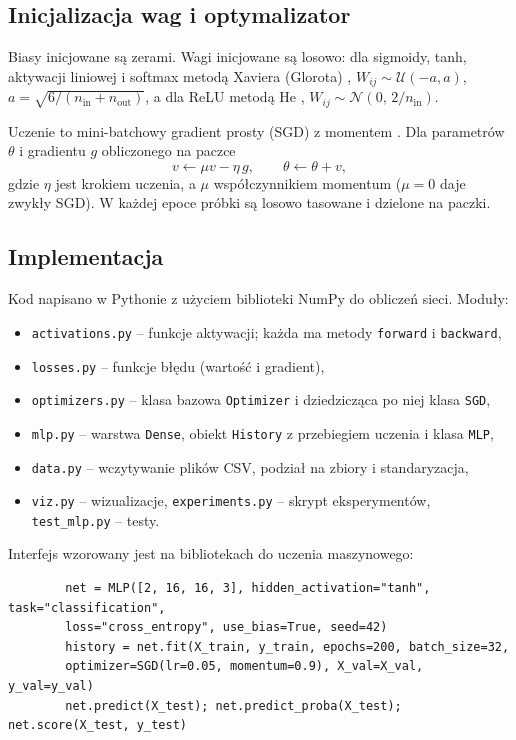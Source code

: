 \documentclass[11pt,a4paper]{article}
\begin{document}
	\subsection{Inicjalizacja wag i optymalizator}
	Biasy inicjowane są zerami. Wagi inicjowane są losowo: dla sigmoidy, tanh, aktywacji liniowej i softmax metodą Xaviera (Glorota) \cite{glorot2010}, $W_{ij}\sim\mathcal{U}(-a,a)$, $a=\sqrt{6/(n_{\mathrm{in}}+n_{\mathrm{out}})}$, a dla ReLU metodą He \cite{he2015}, $W_{ij}\sim\mathcal{N}(0,\,2/n_{\mathrm{in}})$.
	
	Uczenie to mini-batchowy gradient prosty (SGD) z momentem \cite{polyak1964}. Dla parametrów $\theta$ i gradientu $g$ obliczonego na paczce
	\begin{equation}
		v \leftarrow \mu v - \eta\, g, \qquad \theta \leftarrow \theta + v,
	\end{equation}
	gdzie $\eta$ jest krokiem uczenia, a $\mu$ współczynnikiem momentum ($\mu=0$ daje zwykły SGD). W każdej epoce próbki są losowo tasowane i dzielone na paczki.
	
	\subsection{Implementacja}
	Kod napisano w Pythonie z użyciem biblioteki NumPy do obliczeń sieci. Moduły:
	\begin{itemize}
		\item \texttt{activations.py} -- funkcje aktywacji; każda ma metody \texttt{forward} i \texttt{backward},
		\item \texttt{losses.py} -- funkcje błędu (wartość i gradient),
		\item \texttt{optimizers.py} -- klasa bazowa \texttt{Optimizer} i dziedzicząca po niej klasa \texttt{SGD},
		\item \texttt{mlp.py} -- warstwa \texttt{Dense}, obiekt \texttt{History} z przebiegiem uczenia i klasa \texttt{MLP},
		\item \texttt{data.py} -- wczytywanie plików CSV, podział na zbiory i standaryzacja,
		\item \texttt{viz.py} -- wizualizacje, \texttt{experiments.py} -- skrypt eksperymentów, \texttt{test\_mlp.py} -- testy.
	\end{itemize}
	Interfejs wzorowany jest na bibliotekach do uczenia maszynowego:
	\begin{verbatim}
		net = MLP([2, 16, 16, 3], hidden_activation="tanh", task="classification",
		loss="cross_entropy", use_bias=True, seed=42)
		history = net.fit(X_train, y_train, epochs=200, batch_size=32,
		optimizer=SGD(lr=0.05, momentum=0.9), X_val=X_val, y_val=y_val)
		net.predict(X_test); net.predict_proba(X_test); net.score(X_test, y_test)
	\end{verbatim}
\end{document}
